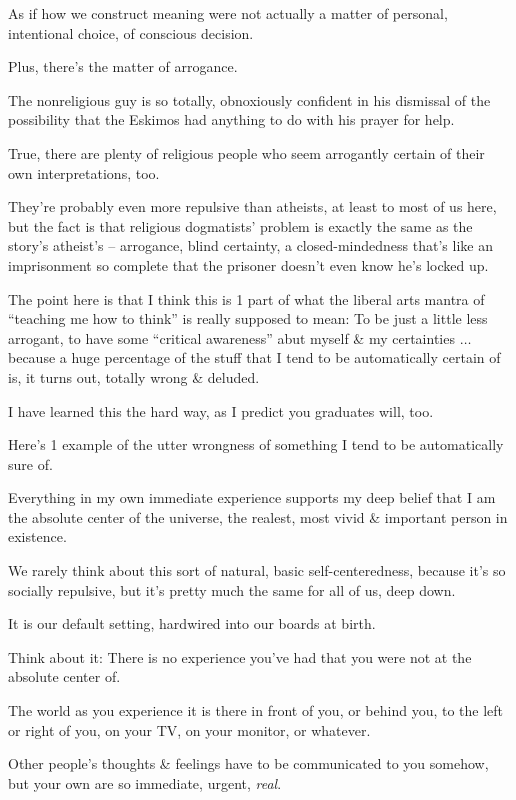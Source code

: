 \documentclass{article}
\numberwithin{equation}{section}
\begin{document}
As if how we construct meaning were not actually a matter of personal, intentional choice, of conscious decision.

Plus, there's the matter of arrogance.

The nonreligious guy is so totally, obnoxiously confident in his dismissal of the possibility that the Eskimos had anything to do with his prayer for help.

True, there are plenty of religious people who seem arrogantly certain of their own interpretations, too.

They're probably even more repulsive than atheists, at least to most of us here, but the fact is that religious dogmatists' problem is exactly the same as the story's atheist's -- arrogance, blind certainty, a closed-mindedness that's like an imprisonment so complete that the prisoner doesn't even know he's locked up.

The point here is that I think this is 1 part of what the liberal arts mantra of ``teaching me how to think'' is really supposed to mean: To be just a little less arrogant, to have some ``critical awareness'' abut myself \& my certainties $\ldots$ because a huge percentage of the stuff that I tend to be automatically certain of is, it turns out, totally wrong \& deluded.

I have learned this the hard way, as I predict you graduates will, too.

Here's 1 example of the utter wrongness of something I tend to be automatically sure of.

Everything in my own immediate experience supports my deep belief that I am the absolute center of the universe, the realest, most vivid \& important person in existence.

We rarely think about this sort of natural, basic self-centeredness, because it's so socially repulsive, but it's pretty much the same for all of us, deep down.

It is our default setting, hardwired into our boards at birth.

Think about it: There is no experience you've had that you were not at the absolute center of.

The world as you experience it is there in front of you, or behind you, to the left or right of you, on your TV, on your monitor, or whatever.

Other people's thoughts \& feelings have to be communicated to you somehow, but your own are so immediate, urgent, \textit{real}.
\end{document}
